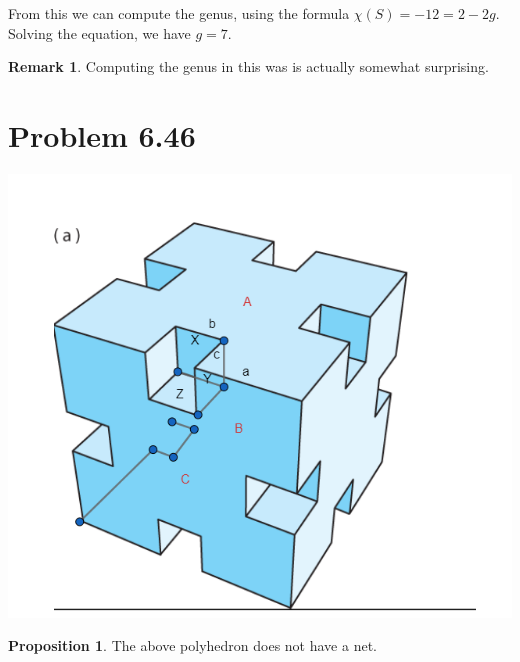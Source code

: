 \documentclass[12pt]{article}
\theoremstyle{definition}
\newtheorem{proposition}{Proposition}
\newtheorem{remark}{Remark}
\begin{document}
From this we can compute the genus, using the formula $\chi(S) = -12 = 2 - 2g$. Solving the equation, we have $g = 7$.

\begin{remark}
Computing the genus in this was is actually somewhat surprising. 
\end{remark} 


\section{Problem 6.46}


\includegraphics[scale=0.5]{unfolding_proof.png}


\begin{proposition}

The above polyhedron does not have a net.
\end{proposition}
\end{document}

